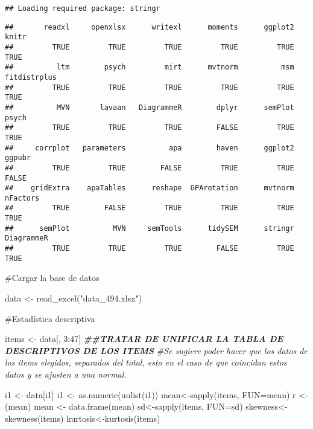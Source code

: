 \documentclass[
]{article}
\newenvironment{Shaded}{\begin{snugshade}}{\end{snugshade}}
\newcommand{\AttributeTok}[1]{\textcolor[rgb]{0.77,0.63,0.00}{#1}}
\newcommand{\CommentTok}[1]{\textcolor[rgb]{0.56,0.35,0.01}{\textit{#1}}}
\newcommand{\DecValTok}[1]{\textcolor[rgb]{0.00,0.00,0.81}{#1}}
\newcommand{\DocumentationTok}[1]{\textcolor[rgb]{0.56,0.35,0.01}{\textbf{\textit{#1}}}}
\newcommand{\FunctionTok}[1]{\textcolor[rgb]{0.00,0.00,0.00}{#1}}
\newcommand{\NormalTok}[1]{#1}
\newcommand{\OtherTok}[1]{\textcolor[rgb]{0.56,0.35,0.01}{#1}}
\newcommand{\SpecialCharTok}[1]{\textcolor[rgb]{0.00,0.00,0.00}{#1}}
\newcommand{\StringTok}[1]{\textcolor[rgb]{0.31,0.60,0.02}{#1}}
\begin{document}
\begin{verbatim}
## Loading required package: stringr
\end{verbatim}

\begin{verbatim}
##       readxl     openxlsx      writexl      moments      ggplot2        knitr 
##         TRUE         TRUE         TRUE         TRUE         TRUE         TRUE 
##          ltm        psych         mirt      mvtnorm          msm fitdistrplus 
##         TRUE         TRUE         TRUE         TRUE         TRUE         TRUE 
##          MVN       lavaan   DiagrammeR        dplyr      semPlot        psych 
##         TRUE         TRUE         TRUE        FALSE         TRUE         TRUE 
##     corrplot   parameters          apa        haven      ggplot2       ggpubr 
##         TRUE         TRUE        FALSE         TRUE         TRUE        FALSE 
##    gridExtra    apaTables      reshape  GPArotation      mvtnorm     nFactors 
##         TRUE        FALSE         TRUE         TRUE         TRUE         TRUE 
##      semPlot          MVN     semTools      tidySEM      stringr   DiagrammeR 
##         TRUE         TRUE         TRUE        FALSE         TRUE         TRUE
\end{verbatim}

\#Cargar la base de datos

\begin{Shaded}
\begin{Highlighting}[]
\NormalTok{data }\OtherTok{\textless{}{-}} \FunctionTok{read\_excel}\NormalTok{(}\StringTok{"data\_494.xlsx"}\NormalTok{)}
\end{Highlighting}
\end{Shaded}

\#Estadística descriptiva

\begin{Shaded}
\begin{Highlighting}[]
\NormalTok{items }\OtherTok{\textless{}{-}}\NormalTok{ data[, }\DecValTok{3}\SpecialCharTok{:}\DecValTok{47}\NormalTok{]}
\DocumentationTok{\#\#TRATAR DE UNIFICAR LA TABLA DE DESCRIPTIVOS DE LOS ITEMS}
\CommentTok{\#Se sugiere poder hacer que los datos de los items elegidos, separados del total, esto en el caso de que coincidan estos datos y se ajusten a una normal.}

\NormalTok{i1 }\OtherTok{\textless{}{-}}\NormalTok{ data[}\StringTok{\textquotesingle{}i1\textquotesingle{}}\NormalTok{]}
\NormalTok{i1 }\OtherTok{\textless{}{-}} \FunctionTok{as.numeric}\NormalTok{(}\FunctionTok{unlist}\NormalTok{(i1))}
\NormalTok{mean}\OtherTok{\textless{}{-}}\FunctionTok{sapply}\NormalTok{(items, }\AttributeTok{FUN=}\NormalTok{mean)}
\NormalTok{r }\OtherTok{\textless{}{-}}\NormalTok{ (mean)}
\NormalTok{mean }\OtherTok{\textless{}{-}} \FunctionTok{data.frame}\NormalTok{(mean)}
\NormalTok{sd}\OtherTok{\textless{}{-}}\FunctionTok{sapply}\NormalTok{(items, }\AttributeTok{FUN=}\NormalTok{sd)}
\NormalTok{skewness}\OtherTok{\textless{}{-}}\FunctionTok{skewness}\NormalTok{(items)}
\NormalTok{kurtosis}\OtherTok{\textless{}{-}}\FunctionTok{kurtosis}\NormalTok{(items)}
\end{Highlighting}
\end{Shaded}
\end{document}
